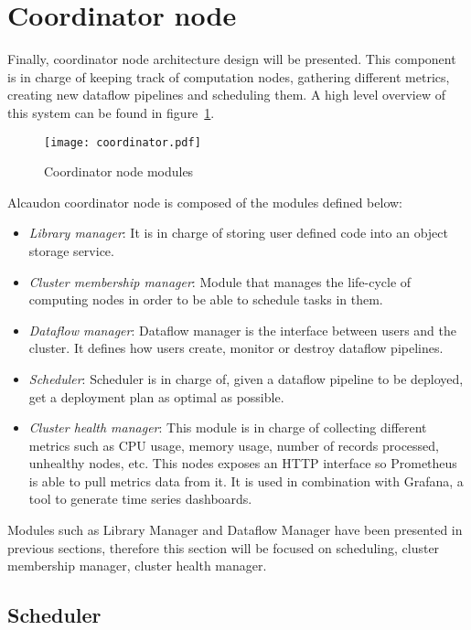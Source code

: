 \section{Coordinator node}

Finally, coordinator node architecture design will be presented. This component
is in charge of keeping track of computation nodes, gathering different metrics,
creating new dataflow pipelines and scheduling them. A high level overview of this
system can be found in figure~\ref{fig:coordinatormodules}.

\begin{figure}[!h]
  \centering
  \texttt{[image: coordinator.pdf]}
  \caption{Coordinator node modules}
  \label{fig:coordinatormodules}
\end{figure}

Alcaudon coordinator node is composed of the modules defined below:
\begin{itemize}
  \item \textit{Library manager}: It is in charge of storing user defined code
    into an object storage service.
  \item \textit{Cluster membership manager}: Module that manages the life-cycle of
    computing nodes in order to be able to schedule tasks in them.
  \item \textit{Dataflow manager}: Dataflow manager is the interface between
    users and the cluster. It defines how users create, monitor or destroy
    dataflow pipelines.
  \item \textit{Scheduler}: Scheduler is in charge of, given a dataflow pipeline
    to be deployed, get a deployment plan as optimal as possible.
  \item \textit{Cluster health manager}: This module is in charge of collecting
    different metrics such as CPU usage, memory usage, number of records
    processed, unhealthy nodes, etc. This nodes exposes an \acs{HTTP} interface
    so Prometheus is able to pull metrics data from it. It is used in
    combination with Grafana, a tool to generate time series dashboards.
\end{itemize}

Modules such as Library Manager and Dataflow Manager have been presented in
previous sections, therefore this section will be focused on scheduling, cluster
membership manager, cluster health manager.

\subsection{Scheduler}

